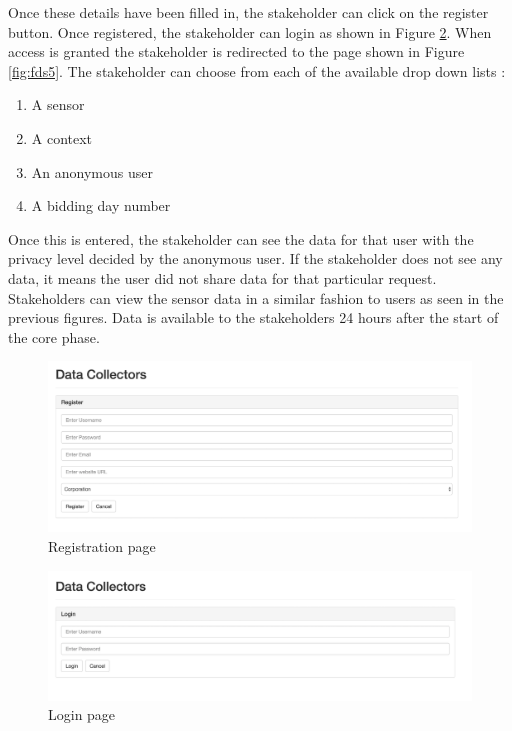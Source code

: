Once these details have been filled in, the stakeholder can click on the register button. Once registered, the stakeholder can login as shown in Figure \ref{fig:fdsdclogin}. When access is granted the stakeholder is redirected to the page shown in Figure \ref{fig:fds5}. The stakeholder can choose from each of the available drop down lists :

\begin{enumerate}
    \item A sensor
    \item A context
    \item An anonymous user
    \item A bidding day number
\end{enumerate}

Once this is entered, the stakeholder can see the  data for that user with the privacy level decided by the anonymous user. If the stakeholder does not see any data, it means the user did not share data for that particular request. Stakeholders can view the sensor data in a similar fashion to users as seen in the previous figures. Data is available to the stakeholders 24 hours after the start of the core phase.



\begin{figure}[ht!]
\centering
\includegraphics[width=\textwidth,keepaspectratio]{./images/fds_dc_register1}
\caption{Registration page\label{fig:fdsdcregister}}
\end{figure}

\begin{figure}[ht!]
\centering
\includegraphics[width=\textwidth,keepaspectratio]{./images/fds_dc_login1}
\caption{Login page\label{fig:fdsdclogin}}
\end{figure}

